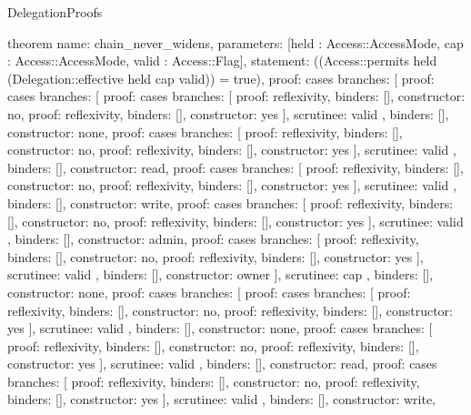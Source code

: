 \begin{lexlean}{DelegationProofs}
\begin{semanticmodule}
theorem{
  name: chain_never_widens,
  parameters: [held : Access::AccessMode, cap : Access::AccessMode, valid : Access::Flag],
  statement: ((Access::permits held (Delegation::effective held cap valid)) = true),
  proof: cases{
    branches: [
      {proof: cases{
        branches: [
          {proof: cases{
            branches: [
              {proof: reflexivity{}, binders: [], constructor: no},
              {proof: reflexivity{}, binders: [], constructor: yes}
            ],
            scrutinee: valid
          }, binders: [], constructor: none},
          {proof: cases{
            branches: [
              {proof: reflexivity{}, binders: [], constructor: no},
              {proof: reflexivity{}, binders: [], constructor: yes}
            ],
            scrutinee: valid
          }, binders: [], constructor: read},
          {proof: cases{
            branches: [
              {proof: reflexivity{}, binders: [], constructor: no},
              {proof: reflexivity{}, binders: [], constructor: yes}
            ],
            scrutinee: valid
          }, binders: [], constructor: write},
          {proof: cases{
            branches: [
              {proof: reflexivity{}, binders: [], constructor: no},
              {proof: reflexivity{}, binders: [], constructor: yes}
            ],
            scrutinee: valid
          }, binders: [], constructor: admin},
          {proof: cases{
            branches: [
              {proof: reflexivity{}, binders: [], constructor: no},
              {proof: reflexivity{}, binders: [], constructor: yes}
            ],
            scrutinee: valid
          }, binders: [], constructor: owner}
        ],
        scrutinee: cap
      }, binders: [], constructor: none},
      {proof: cases{
        branches: [
          {proof: cases{
            branches: [
              {proof: reflexivity{}, binders: [], constructor: no},
              {proof: reflexivity{}, binders: [], constructor: yes}
            ],
            scrutinee: valid
          }, binders: [], constructor: none},
          {proof: cases{
            branches: [
              {proof: reflexivity{}, binders: [], constructor: no},
              {proof: reflexivity{}, binders: [], constructor: yes}
            ],
            scrutinee: valid
          }, binders: [], constructor: read},
          {proof: cases{
            branches: [
              {proof: reflexivity{}, binders: [], constructor: no},
              {proof: reflexivity{}, binders: [], constructor: yes}
            ],
            scrutinee: valid
          }, binders: [], constructor: write},
}}}}
\end{semanticmodule}
\end{lexlean}
